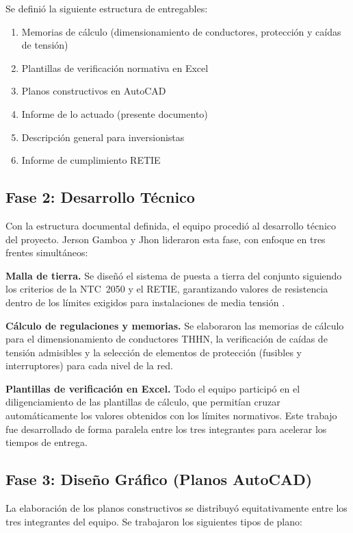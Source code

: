 Se defini\'o la siguiente estructura de entregables:

\begin{enumerate}
  \item Memorias de c\'alculo (dimensionamiento de conductores,
    protecci\'on y ca\'idas de tensi\'on)
  \item Plantillas de verificaci\'on normativa en Excel
  \item Planos constructivos en AutoCAD
  \item Informe de lo actuado (presente documento)
  \item Descripci\'on general para inversionistas
  \item Informe de cumplimiento RETIE
\end{enumerate}

\subsection{Fase 2: Desarrollo T\'ecnico}

Con la estructura documental definida, el equipo procedi\'o al
desarrollo t\'ecnico del proyecto. Jerson Gamboa y Jhon lideraron
esta fase, con enfoque en tres frentes simult\'aneos:

\textbf{Malla de tierra.} Se dise\~n\'o el sistema de puesta a
tierra del conjunto siguiendo los criterios de la NTC~2050 y el
RETIE, garantizando valores de resistencia dentro de los l\'imites
exigidos para instalaciones de media tensi\'on
\citep{minminas2013retie}.

\textbf{C\'alculo de regulaciones y memorias.} Se elaboraron las
memorias de c\'alculo para el dimensionamiento de conductores THHN,
la verificaci\'on de ca\'idas de tensi\'on admisibles y la
selecci\'on de elementos de protecci\'on (fusibles y
interruptores) para cada nivel de la red.

\textbf{Plantillas de verificaci\'on en Excel.} Todo el equipo
particip\'o en el diligenciamiento de las plantillas de c\'alculo,
que permit\'ian cruzar autom\'aticamente los valores obtenidos con
los l\'imites normativos. Este trabajo fue desarrollado de forma
paralela entre los tres integrantes para acelerar los tiempos
de entrega.

\subsection{Fase 3: Dise\~no Gr\'afico (Planos AutoCAD)}

La elaboraci\'on de los planos constructivos se distribuy\'o
equitativamente entre los tres integrantes del equipo. Se
trabajaron los siguientes tipos de plano:

